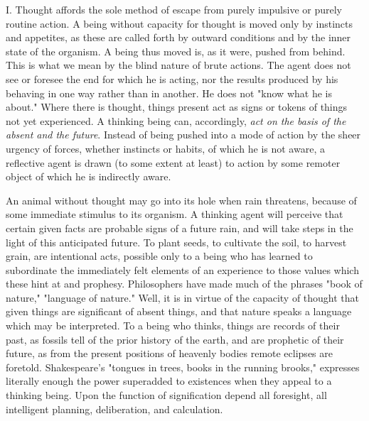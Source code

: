 \documentclass[showtrims,ustradepaper]{memoir}
\begin{document}
I. Thought affords the sole method of escape from purely impulsive or
purely routine action. A being without capacity for thought is moved
only by instincts and appetites, as these are called forth by outward
conditions and by the inner state of the organism. A being thus moved
is, as it were, pushed from behind. This is what we mean by the blind
nature of brute actions. The agent does not see or foresee the end for
which he is acting, nor the results produced by his behaving in one way
rather than in another. He does not "know what he is about." Where there
is thought, things present act as signs or tokens of things not yet
experienced. A thinking being can, accordingly, \emph{act on the basis
of the absent and the future}. Instead of being pushed into a mode of
action by the sheer urgency of forces,
whether
instincts or habits, of which he is not aware, a reflective agent is
drawn (to some extent at least) to action by some remoter object of
which he is indirectly aware.


An animal without thought may go into its hole when rain threatens,
because of some immediate stimulus to its organism. A thinking agent
will perceive that certain given facts are probable signs of a future
rain, and will take steps in the light of this anticipated future. To
plant seeds, to cultivate the soil, to harvest grain, are intentional
acts, possible only to a being who has learned to subordinate the
immediately felt elements of an experience to those values which these
hint at and prophesy. Philosophers have made much of the phrases "book
of nature," "language of nature." Well, it is in virtue of the capacity
of thought that given things are significant of absent things, and that
nature speaks a language which may be interpreted. To a being who
thinks, things are records of their past, as fossils tell of the prior
history of the earth, and are prophetic of their future, as from the
present positions of heavenly bodies remote eclipses are foretold.
Shakespeare's "tongues in trees, books in the running brooks," expresses
literally enough the power superadded to existences when they appeal to
a thinking being. Upon the function of signification depend all
foresight, all intelligent planning, deliberation, and calculation.

\end{document}
